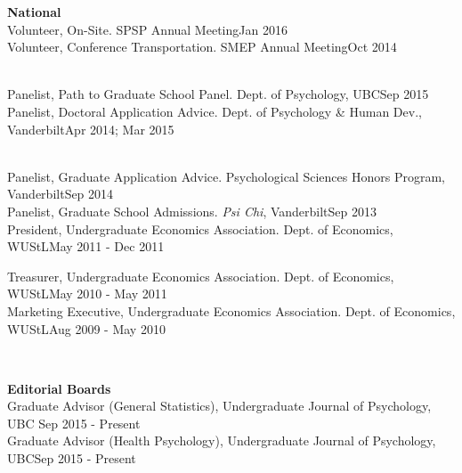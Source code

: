 {\large \textbf{National}}\smallskip\\
Volunteer, On-Site. SPSP Annual Meeting\hfill{Jan 2016}\smallskip\\
Volunteer, Conference Transportation. SMEP Annual Meeting\hfill{Oct 2014}\medskip\\
%
%
\begin{minipage}{\linewidth}\smallskip\\
Panelist, Path to Graduate School Panel. Dept. of Psychology, UBC\hfill {Sep 2015}\smallskip\\
Panelist, Doctoral Application Advice. Dept. of Psychology \& Human Dev., Vanderbilt\hfill {Apr 2014; Mar 2015}\vspace{1.1mm}\end{minipage}\smallskip\\
Panelist, Graduate Application Advice. Psychological Sciences Honors Program, Vanderbilt\hfill {Sep 2014}\smallskip\\
Panelist, Graduate School Admissions. \textit{Psi Chi}, Vanderbilt\hfill {Sep 2013}\smallskip\\
President, Undergraduate Economics Association. Dept. of Economics, WUStL\hfill  {May 2011 - Dec 2011}\smallskip\\
\begin{minipage}{\linewidth}\vspace{1.1mm} Treasurer, Undergraduate Economics Association. Dept. of Economics, WUStL\hfill{May 2010 - May 2011}\smallskip\\
Marketing Executive, Undergraduate Economics Association. Dept. of Economics, WUStL\hfill  {Aug 2009 - May 2010}\end{minipage}\medskip\\
%
%
\begin{minipage}{\linewidth}\vspace{1.1mm} {\large \textbf{Editorial Boards}}\\
Graduate Advisor (General Statistics), Undergraduate Journal of Psychology, UBC \hfill{Sep 2015 - Present}\smallskip\\
Graduate Advisor (Health Psychology), Undergraduate Journal of Psychology, UBC\hfill{Sep 2015 - Present}\end{minipage}\medskip\\
